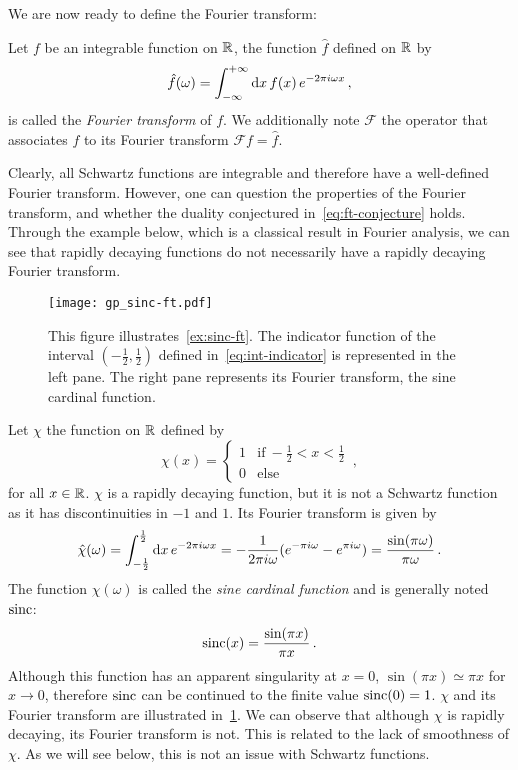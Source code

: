 We are now ready to define the Fourier transform:
\begin{definition}
  Let $f$ be an integrable function on $\mathbb{R}$, the function $\hat{f}$ defined on $\mathbb{R}$ by
  \begin{equation}
    \hat{f}(\omega)=\int_{-\infty}^{+\infty}\mathrm{d} x\,f(x)\,e^{-2\pi i\omega x}\,,
  \end{equation}
  is called the \emph{Fourier transform} of $f$. We additionally note $\mathcal{F}$ the
  operator that associates $f$ to its Fourier transform $\mathcal{F}f=\hat{f}$.
\end{definition}
Clearly, all Schwartz functions are integrable and therefore have a well-defined
Fourier transform. However, one can question the properties of the Fourier transform,
and whether the duality conjectured in~\cref{eq:ft-conjecture} holds. Through the example
below, which is a classical result in Fourier analysis, we can see that rapidly decaying
functions do not necessarily have a rapidly decaying Fourier transform.
\begin{figure}[t]
  \centering
  \texttt{[image: gp\_sinc-ft.pdf]}
  \caption{This figure illustrates~\cref{ex:sinc-ft}. The indicator function of the interval $(-\frac{1}{2},\frac{1}{2})$ defined in~\cref{eq:int-indicator} is represented in the left pane. The right pane represents its Fourier transform, the sine cardinal function.}
  \label{fig:sinc-ft}
\end{figure}
\begin{example}
  \label{ex:sinc-ft}
  Let $\chi$ the function on $\mathbb{R}$ defined by
  \begin{equation}
    \chi(x)=
    \begin{cases}
      1&\text{if}~-\frac{1}{2}<x<\frac{1}{2}\\
      0&\text{else}
    \end{cases}\,,
    \label{eq:int-indicator}
  \end{equation}
  for all $x\in\mathbb{R}$. $\chi$ is a rapidly decaying function, but it is not a Schwartz
  function as it has discontinuities in $-1$ and $1$. Its Fourier transform is given by
  \begin{equation}
    \hat{\chi}(\omega)=\int_{-\frac12}^{\frac12}\mathrm{d} x\,e^{-2\pi i\omega x}=
    -\frac{1}{2\pi i\omega}(e^{-\pi i\omega}-e^{\pi i\omega})=\frac{\sin(\pi\omega)}{\pi\omega}\,.
  \end{equation}
  The function $\hat{\chi}(\omega)$ is called the \emph{sine cardinal function} and
  is generally noted $\operatorname{sinc}$:
  \begin{equation}
    \operatorname{sinc}(x)=\frac{\sin(\pi x)}{\pi x}\,.
  \end{equation}
  Although this function has an apparent singularity at $x=0$, $\sin(\pi x)\simeq \pi x$
  for $x\to0$, therefore $\operatorname{sinc}$ can be continued to the finite value $\operatorname{sinc}(0)=1$.
  $\chi$ and its Fourier transform are illustrated in~\cref{fig:sinc-ft}.
  We can observe that although $\chi$ is rapidly decaying, its Fourier transform is not.
  This is related to the lack of smoothness of $\chi$. As we will see below, this is not
  an issue with Schwartz functions.
\end{example}
